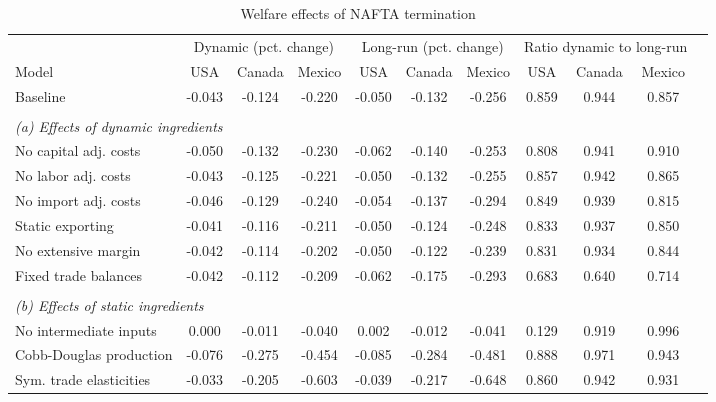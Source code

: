 \begin{table}[h!]
\footnotesize
\renewcommand{\arraystretch}{1.2}
\begin{center}
\caption{Welfare effects of NAFTA termination}
\label{tab:welfare}
\begin{tabular}{lcccccccccc}\toprule
& \multicolumn{3}{c}{Dynamic (pct. change)} & \multicolumn{3}{c}{Long-run (pct. change)} & \multicolumn{3}{c}{Ratio dynamic to long-run}\\
\cmidrule(rl){2-4}\cmidrule(rl){5-7}\cmidrule(rl){8-10}
Model& \multicolumn{1}{p{1.0cm}}{\centering USA}& \multicolumn{1}{p{1.0cm}}{\centering Canada}& \multicolumn{1}{p{1.0cm}}{\centering Mexico}& \multicolumn{1}{p{1.0cm}}{\centering USA}& \multicolumn{1}{p{1.0cm}}{\centering Canada}& \multicolumn{1}{p{1.0cm}}{\centering Mexico}& \multicolumn{1}{p{1.0cm}}{\centering USA}& \multicolumn{1}{p{1.0cm}}{\centering Canada}& \multicolumn{1}{p{1.0cm}}{\centering Mexico}\\
\midrule
Baseline& -0.043& -0.124& -0.220& -0.050& -0.132& -0.256& 0.859& 0.944& 0.857\\
\\
\multicolumn{10}{l}{\textit{(a) Effects of dynamic ingredients}}\\
No capital adj. costs& -0.050& -0.132& -0.230& -0.062& -0.140& -0.253& 0.808& 0.941& 0.910\\
No labor adj. costs& -0.043& -0.125& -0.221& -0.050& -0.132& -0.255& 0.857& 0.942& 0.865\\
No import adj. costs& -0.046& -0.129& -0.240& -0.054& -0.137& -0.294& 0.849& 0.939& 0.815\\
Static exporting& -0.041& -0.116& -0.211& -0.050& -0.124& -0.248& 0.833& 0.937& 0.850\\
No extensive margin& -0.042& -0.114& -0.202& -0.050& -0.122& -0.239& 0.831& 0.934& 0.844\\
Fixed trade balances& -0.042& -0.112& -0.209& -0.062& -0.175& -0.293& 0.683& 0.640& 0.714\\
\\
\multicolumn{10}{l}{\textit{(b) Effects of static ingredients}}\\
No intermediate inputs& 0.000& -0.011& -0.040& 0.002& -0.012& -0.041& 0.129& 0.919& 0.996\\
Cobb-Douglas production& -0.076& -0.275& -0.454& -0.085& -0.284& -0.481& 0.888& 0.971& 0.943\\
Sym. trade elasticities& -0.033& -0.205& -0.603& -0.039& -0.217& -0.648& 0.860& 0.942& 0.931\\

\end{tabular}
\end{center}
\end{table}
